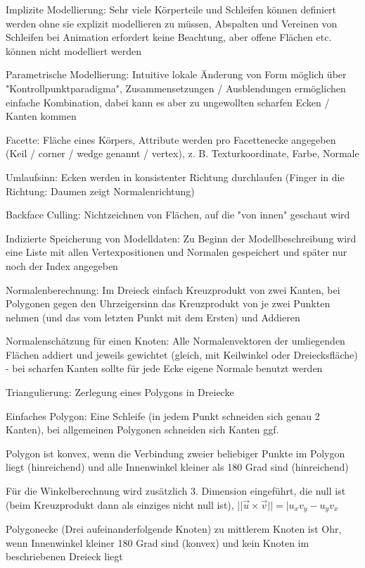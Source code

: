 \documentclass[12pt,landscape]{article}
\begin{document}
\begin{multicols}{3}
\begin{compactitem}
\item Implizite Modellierung: Sehr viele Körperteile und Schleifen können definiert werden ohne sie explizit modellieren zu müssen, Abspalten und Vereinen von Schleifen bei Animation erfordert keine Beachtung, aber offene Flächen etc. können nicht modelliert werden
\item Parametrische Modellierung: Intuitive lokale Änderung von Form möglich über "Kontrollpunktparadigma", Zusammensetzungen / Ausblendungen ermöglichen einfache Kombination, dabei kann es aber zu ungewollten scharfen Ecken / Kanten kommen
\item Facette: Fläche eines Körpers, Attribute werden pro Facettenecke angegeben (Keil / corner / wedge genannt / vertex), z. B. Texturkoordinate, Farbe, Normale
\item Umlaufsinn: Ecken werden in konsistenter Richtung durchlaufen (Finger in die Richtung: Daumen zeigt Normalenrichtung)
\item Backface Culling: Nichtzeichnen von Flächen, auf die "von innen" geschaut wird 
\item Indizierte Speicherung von Modelldaten: Zu Beginn der Modellbeschreibung wird eine Liste mit allen Vertexpositionen und Normalen gespeichert und später nur noch der Index angegeben
\item Normalenberechnung: Im Dreieck einfach Kreuzprodukt von zwei Kanten, bei Polygonen gegen den Uhrzeigersinn das Kreuzprodukt von je zwei Punkten nehmen (und das vom letzten Punkt mit dem Ersten) und Addieren
\item Normalenschätzung für einen Knoten: Alle Normalenvektoren der umliegenden Flächen addiert und jeweils gewichtet (gleich, mit Keilwinkel oder Dreiecksfläche) - bei scharfen Kanten sollte für jede Ecke eigene Normale benutzt werden
\item Triangulierung: Zerlegung eines Polygons in Dreiecke
\item Einfaches Polygon: Eine Schleife (in jedem Punkt schneiden sich genau 2 Kanten), bei allgemeinen Polygonen schneiden sich Kanten ggf.
\item Polygon ist konvex, wenn die Verbindung zweier beliebiger Punkte im Polygon liegt (hinreichend) und alle Innenwinkel kleiner als 180 Grad sind (hinreichend)
\item Für die Winkelberechnung wird zusätzlich 3. Dimension eingeführt, die null ist (beim Kreuzprodukt dann als einziges nicht null ist), $||\vec{u} \times \vec{v}|| = |u_{x}v_{y} - u_{y}v_{x}$
\item Polygonecke (Drei aufeinanderfolgende Knoten) zu mittlerem Knoten ist Ohr, wenn Innenwinkel kleiner 180 Grad sind (konvex) und kein Knoten im beschriebenen Dreieck liegt

\end{compactitem}
\end{multicols}
\end{document}
